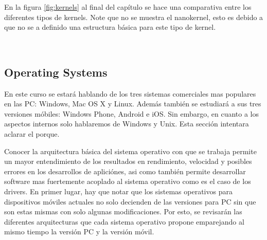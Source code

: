 En la figura \ref{fig:kernels} al final del capítulo se hace una comparativa
entre los diferentes tipos de kernels. Note que no se muestra el nanokernel,
esto es debido a que no se a definido una estructura básica para este tipo de
kernel.

\begin{figure*}[h]
  \centering
  \\
  \caption{Comparativa De Los Diferentes Tipos de kernel}
  \label{fig:kernels}
\end{figure*}

\subsection{Operating Systems}
En este curso se estará hablando de los tres sistemas comerciales mas populares
en las PC: Windows, Mac OS X y Linux. Además también se estudiará a sus tres
versiones móbiles: Windows Phone, Android e iOS. Sin embargo, en cuanto a los
aspectos internos solo hablaremos de Windows y Unix. Esta sección intentara
aclarar el porque.

Conocer la arquitectura básica del sistema operativo con que se trabaja permite
un mayor entendimiento de los resultados en rendimiento, velocidad y posibles
errores en los desarrollos de apliciónes, asi como también permite desarrollar
software mas fuertemente acoplado al sistema operativo como es el caso de los
drivers. En primer lugar, hay que notar que los sistemas operativos para
dispositivos móviles actuales no solo decienden de las versiones para PC sin
que son estas mismas con solo algunas modificaciones. Por esto, se revisarán
las diferentes arquitecturas que cada sistema operativo propone emparejando al
mismo tiempo la versión PC y la versión móvil.

